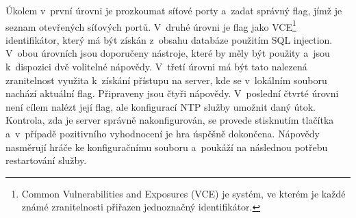 \documentclass[
  digital, %
  oneside, %
  table,   %
  nolof,     %
  nolot,     %
  nocover
]{fithesis3}
\begin{document}
Úkolem v~první úrovni je prozkoumat síťové porty a~zadat správný flag, jímž je seznam otevřených síťových portů. V~druhé úrovni je flag jako VCE\footnote{Common Vulnerabilities and Exposures (VCE) je systém, ve kterém je každé známé zranitelnosti přiřazen jednoznačný identifikátor.} identifikátor, který má být získán z~obsahu databáze použitím SQL injection. V~obou úrovních jsou doporučeny nástroje, které by měly být použity a~jsou k~dispozici dvě volitelné nápovědy. V~třetí úrovni má být tato nalezená zranitelnost využita k~získání přístupu na server, kde se v~lokálním souboru nachází aktuální flag. Připraveny jsou čtyři nápovědy. V~poslední čtvrté úrovni není cílem nalézt její flag, ale konfigurací NTP služby umožnit daný útok. Kontrola, zda je server správně nakonfigurován, se provede stisknutím tlačítka a~v~případě pozitivního vyhodnocení je hra úspěšně dokončena. Nápovědy nasměrují hráče ke konfiguračnímu souboru a~poukáží na následnou potřebu restartování služby.
\end{document}
